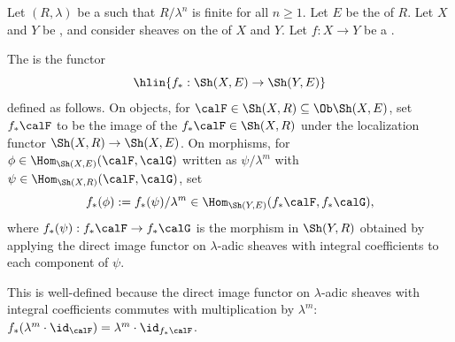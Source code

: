 \begin{definition} \label{definition:direct_image_functor_on_etale_sheaves_with_rational_adic_coefficients_on_a_noetherian_scheme}
Let $(R, \lambda)$ be a   such that $R/\lambda^n$ is finite for all $n \geq 1$. Let $E$ be the  of $R$. Let $X$ and $Y$ be , and consider sheaves on the  of $X$ and $Y$. Let $f: X \to Y$ be a .

The  is the functor
$$\hlin{f_* : \Sh(X, E) \to \Sh(Y, E)}$$
defined as follows. On objects, for $\calF \in \Sh(X, R) \subseteq \Ob \Sh(X, E)$, set $f_* \calF$ to be the image of the  $f_* \calF \in \Sh(X, R)$ under the localization functor $\Sh(X, R) \to \Sh(X, E)$. On morphisms, for $\phi \in \Hom_{\Sh(X, E)}(\calF, \calG)$ written as $\psi / \lambda^m$ with $\psi \in \Hom_{\Sh(X, R)}(\calF, \calG)$, set
$$f_* (\phi) := f_*(\psi) / \lambda^m \in \Hom_{\Sh(Y, E)}(f_* \calF, f_* \calG),$$
where $f_*(\psi): f_* \calF \to f_* \calG$ is the morphism in $\Sh(Y, R)$ obtained by applying the direct image functor on $\lambda$-adic sheaves with integral coefficients to each component of $\psi$.

This is well-defined because the direct image functor on $\lambda$-adic sheaves with integral coefficients commutes with multiplication by $\lambda^m$: $f_*(\lambda^m \cdot \id_\calF) = \lambda^m \cdot \id_{f_* \calF}$.
\end{definition}

